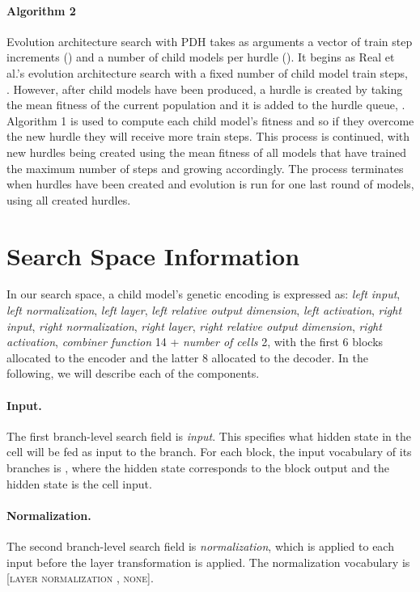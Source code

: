 \documentclass{article}
\begin{document}
\paragraph{Algorithm 2} Evolution architecture search with PDH takes as arguments a vector of train step increments () and a number of child models per hurdle (). It begins as Real et al.'s  evolution architecture search with a fixed number of child model train steps, . However, after  child models have been produced, a hurdle is created by taking the mean fitness of the current population and it is added to the hurdle queue, . Algorithm 1 is used to compute each child model's fitness and so if they overcome the new hurdle they will receive more train steps. This process is continued, with new hurdles being created using the mean fitness of all models that have trained the maximum number of steps and  growing accordingly. The process terminates when  hurdles have been created and evolution is run for one last round of  models, using all created hurdles.

\section{Search Space Information}
In our search space, a child model's genetic encoding is expressed as: \textit{left input}, \textit{left normalization}, \textit{left layer}, \textit{left relative output dimension}, \textit{left activation}, \textit{right input}, \textit{right normalization}, \textit{right layer}, \textit{right relative output dimension}, \textit{right activation}, \textit{combiner function}  14 + \textit{number of cells}  2, with the first 6 blocks allocated to the encoder and the latter 8 allocated to the decoder. In the following, we will describe each of the components.

\paragraph{Input.} The first branch-level search field is \textit{input}. This specifies what hidden state in the cell will be fed as input to the branch. For each  block, the input vocabulary of its branches is , where the  hidden state corresponds to the  block output and the  hidden state is the cell input.   

\paragraph{Normalization.} The second branch-level search field is \textit{normalization}, which is applied to each input before the layer transformation is applied. The normalization vocabulary is [\textsc{layer normalization} \cite{ba16}, \textsc{none}].
\end{document}
